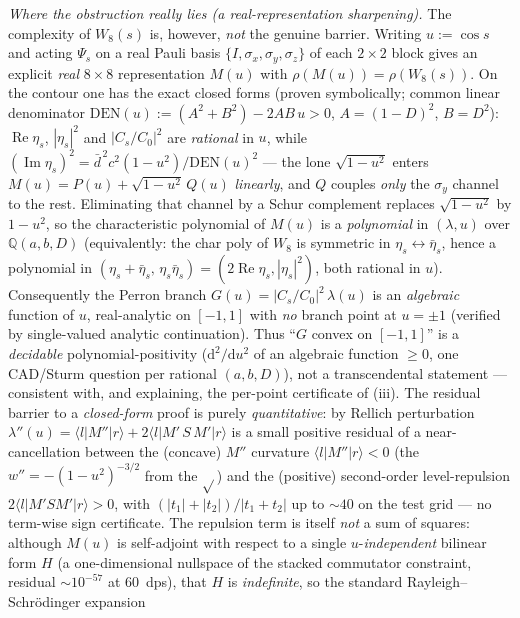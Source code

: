 \documentclass[
]{article}
\begin{document}
\emph{Where the obstruction really lies (a real-representation
sharpening).} The complexity of $W_8(s)$ is, however, \emph{not} the genuine
barrier. Writing $u:=\cos s$ and acting $\Psi_s$ on a real Pauli basis
$\{I,\sigma_x,\sigma_y,\sigma_z\}$ of each $2\times2$ block gives an explicit
\emph{real} $8\times8$ representation $M(u)$ with $\rho(M(u))=\rho(W_8(s))$.
On the contour one has the exact closed forms (proven symbolically; common
linear denominator $\mathrm{DEN}(u):=(A^2+B^2)-2AB\,u>0$, $A=(1-D)^2$,
$B=D^2$): $\operatorname{Re}\eta_s$, $|\eta_s|^2$ and $|C_s/C_0|^2$ are
\emph{rational} in $u$, while
$(\operatorname{Im}\eta_s)^2=\bar d^{\,2}c^2(1-u^2)/\mathrm{DEN}(u)^2$ ---
the lone $\sqrt{1-u^2}$ enters $M(u)=P(u)+\sqrt{1-u^2}\,Q(u)$ \emph{linearly},
and $Q$ couples \emph{only} the $\sigma_y$ channel to the rest. Eliminating
that channel by a Schur complement replaces $\sqrt{1-u^2}$ by $1-u^2$, so the
characteristic polynomial of $M(u)$ is a \emph{polynomial} in $(\lambda,u)$
over $\mathbb Q(a,b,D)$ (equivalently: the char poly of $W_8$ is symmetric in
$\eta_s\leftrightarrow\bar\eta_s$, hence a polynomial in
$(\eta_s+\bar\eta_s,\,\eta_s\bar\eta_s)=(2\operatorname{Re}\eta_s,|\eta_s|^2)$,
both rational in $u$). Consequently the Perron branch
$G(u)=|C_s/C_0|^2\,\lambda(u)$ is an \emph{algebraic} function of $u$,
real-analytic on $[-1,1]$ with \emph{no} branch point at $u=\pm1$ (verified by
single-valued analytic continuation). Thus ``$G$ convex on $[-1,1]$'' is a
\emph{decidable} polynomial-positivity ($\mathrm{d}^2/\mathrm{d}u^2$ of an
algebraic function $\ge0$, one CAD/Sturm question per rational $(a,b,D)$), not
a transcendental statement --- consistent with, and explaining, the per-point
certificate of (iii). The residual barrier to a \emph{closed-form} proof is
purely \emph{quantitative}: by Rellich perturbation
$\lambda''(u)=\langle l|M''|r\rangle+2\langle l|M'\,S\,M'|r\rangle$ is a small
positive residual of a near-cancellation between the (concave) $M''$ curvature
$\langle l|M''|r\rangle<0$ (the $w''=-(1-u^2)^{-3/2}$ from the $\sqrt{}$) and
the (positive) second-order level-repulsion $2\langle l|M'SM'|r\rangle>0$,
with $(|t_1|+|t_2|)/|t_1+t_2|$ up to $\sim40$ on the test grid --- no
term-wise sign certificate. The repulsion term is itself \emph{not} a sum of
squares: although $M(u)$ is self-adjoint with respect to a single
$u$-\emph{independent} bilinear form $H$ (a one-dimensional nullspace of the
stacked commutator constraint, residual $\sim10^{-57}$ at 60~dps), that $H$ is
\emph{indefinite}, so the standard Rayleigh--Schr\"odinger expansion
\end{document}
